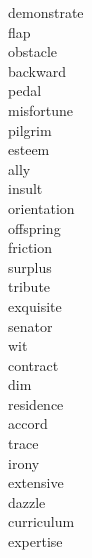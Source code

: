 \documentclass[b5paper, 11pt]{ctexart}
\begin{document}
\begin{multicols*}{3}
\begin{description}
\item[demonstrate]

\item[flap]

\item[obstacle]

\item[backward]

\item[pedal]

\item[misfortune]

\item[pilgrim]

\item[esteem]

\item[ally]

\item[insult]

\item[orientation]

\item[offspring]

\item[friction]

\item[surplus]

\item[tribute]

\item[exquisite]

\item[senator]

\item[wit]

\item[contract]

\item[dim]

\item[residence]

\item[accord]

\item[trace]

\item[irony]

\item[extensive]

\item[dazzle]

\item[curriculum]

\item[expertise]


\end{description}
\end{multicols*}
\end{document}
